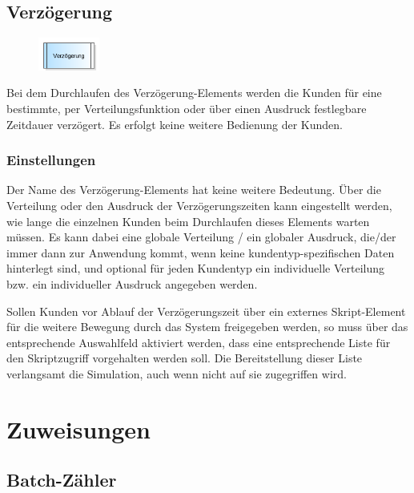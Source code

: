 \section{Verzögerung}
\label{ref:ModelElementDelay}

\begin{figure}
\vspace{-22pt}
\includegraphics[width=2cm]{imageModelElementDelay.png}
\vspace{-22pt}
\end{figure}

Bei dem Durchlaufen des Verzögerung-Elements werden die Kunden für eine bestimmte, per Verteilungsfunktion oder über
einen Ausdruck festlegbare Zeitdauer verzögert. Es erfolgt keine weitere Bedienung der Kunden.

\subsection*{Einstellungen}

Der Name des Verzögerung-Elements hat keine weitere Bedeutung. Über die Verteilung oder den Ausdruck der Verzögerungszeiten kann
eingestellt werden, wie lange die einzelnen Kunden beim Durchlaufen dieses Elements warten müssen.
Es kann dabei eine globale Verteilung / ein globaler Ausdruck, die/der immer dann zur Anwendung kommt, wenn keine
kundentyp-spezifischen Daten hinterlegt sind, und optional für jeden Kundentyp ein individuelle
Verteilung bzw. ein individueller Ausdruck angegeben werden.

Sollen Kunden vor Ablauf der Verzögerungszeit über ein externes Skript-Element für die weitere Bewegung durch das System
freigegeben werden, so muss über das entsprechende Auswahlfeld aktiviert werden, dass eine entsprechende Liste für den
Skriptzugriff vorgehalten werden soll. Die Bereitstellung dieser Liste verlangsamt die Simulation, auch wenn nicht auf
sie zugegriffen wird.





\chapter{Zuweisungen}

\section{Batch-Zähler}
\label{ref:ModelElementCounterBatch}

